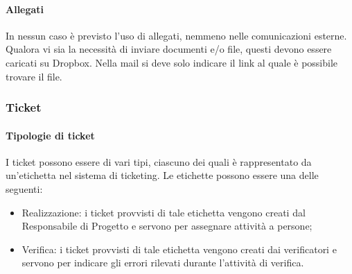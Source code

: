 			\paragraph{Allegati}
				In nessun caso è previsto l'uso di allegati, nemmeno nelle comunicazioni esterne. Qualora vi sia la necessità di inviare documenti e/o file, questi devono essere caricati su Dropbox. Nella mail si deve solo indicare il link al quale è possibile trovare il file.
		\subsubsection{Ticket}
			\paragraph{Tipologie di ticket}
				I ticket possono essere di vari tipi, ciascuno dei quali è rappresentato da un’etichetta nel sistema di ticketing. Le etichette possono essere una delle seguenti:
				\begin{itemize}
					\item Realizzazione: i ticket provvisti di tale etichetta vengono creati dal Responsabile di Progetto e servono per assegnare attività a persone;
					\item Verifica: i ticket provvisti di tale etichetta vengono creati dai verificatori e servono per indicare gli errori rilevati durante l’attività di verifica.
				\end{itemize}
